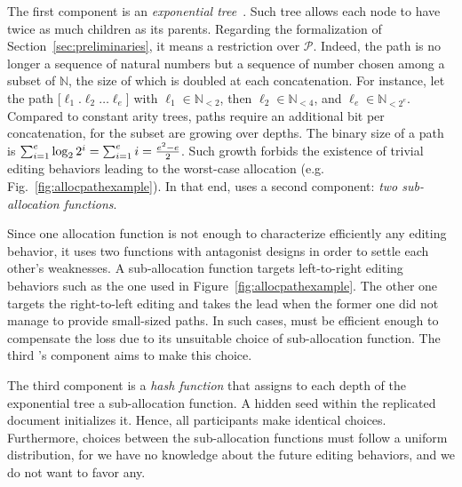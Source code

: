 The first component is an \emph{exponential
  tree}~\cite{andersson1996faster,andersson2007dynamic}. Such tree allows each
node to have twice as much children as its parents. Regarding the formalization
of Section~\ref{sec:preliminaries}, it means a restriction over
$\mathcal{P}$. Indeed, the path is no longer a sequence of natural numbers but a
sequence of number chosen among a subset of $\mathbb{N}$, the size of which is
doubled at each concatenation. For instance, let the path
[$\ell_1.\ell_2\ldots\ell_e$] with $\ell_1\in\mathbb{N}_{<2}$, then
$\ell_2\in \mathbb{N}_{<4}$, and $\ell_{e}\in\mathbb{N}_{<2^e}$. Compared to
constant arity trees, paths require an additional bit per concatenation, for the
subset are growing over depths. The binary size of a path is
$\textstyle\sum\nolimits_{i=1}^{e}\log_2{2^i}=\sum\nolimits_{i=1}^{e}i=
{e^2-e\over{2}}$.
Such growth forbids the existence of trivial editing behaviors leading to the
worst-case allocation (e.g. Fig.~\ref{fig:allocpathexample}). In that end, \LSEQ
uses a second component: \emph{two sub-allocation functions}.

Since one allocation function is not enough to characterize efficiently any
editing behavior, it uses two functions with antagonist designs in order to
settle each other's weaknesses. A sub-allocation function targets left-to-right
editing behaviors such as the one used in Figure~\ref{fig:allocpathexample}. The
other one targets the right-to-left editing and takes the lead when the former
one did not manage to provide small-sized paths. In such cases, \LSEQ must be
efficient enough to compensate the loss due to its unsuitable choice of
sub-allocation function. The third \LSEQ's component aims to make this
choice.

The third component is a \emph{hash function} that assigns to each depth of the
exponential tree a sub-allocation function.  A hidden seed within the replicated
document initializes it. Hence, all participants make identical
choices. Furthermore, choices between the sub-allocation functions must follow a
uniform distribution, for we have no knowledge about the future editing
behaviors, and we do not want to favor any.



